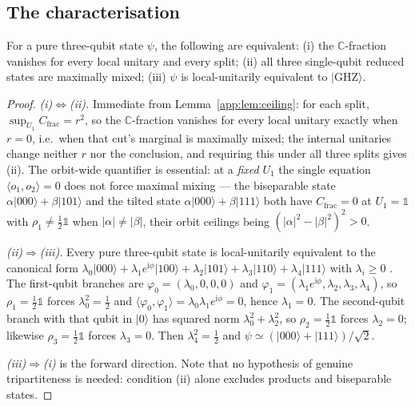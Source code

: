\subsection{The characterisation}

\begin{theorem}\label{app:thm:char}
For a pure three-qubit state $\psi$, the following are equivalent:
(i) the $\mathbb{C}$-fraction vanishes for every local unitary and every split;
(ii) all three single-qubit reduced states are maximally mixed;
(iii) $\psi$ is local-unitarily equivalent to $\lvert\mathrm{GHZ}\rangle$.
\end{theorem}

\begin{proof}
\emph{(i)$\Leftrightarrow$(ii).} Immediate from Lemma~\ref{app:lem:ceiling}: for each split,
$\sup_{U_1}C_{\mathrm{frac}} = r^2$, so the $\mathbb{C}$-fraction vanishes for every local unitary
exactly when $r = 0$, i.e.\ when that cut's marginal is maximally mixed; the internal unitaries
change neither $r$ nor the conclusion, and requiring this under all three splits gives (ii). The
orbit-wide quantifier is essential: at a \emph{fixed} $U_1$ the single equation
$\langle o_1,o_2\rangle = 0$ does not force maximal mixing --- the biseparable state
$\alpha\lvert000\rangle+\beta\lvert101\rangle$ and the tilted state
$\alpha\lvert000\rangle+\beta\lvert111\rangle$ both have $C_{\mathrm{frac}} = 0$ at $U_1=\mathbb{1}$
with $\rho_1\neq\tfrac12\mathbb{1}$ when $|\alpha|\neq|\beta|$, their orbit ceilings being
$(|\alpha|^2-|\beta|^2)^2 > 0$.

\emph{(ii)$\Rightarrow$(iii).} Every pure three-qubit state is local-unitarily equivalent to the
canonical form
$\lambda_0\lvert000\rangle + \lambda_1e^{\mathrm{i}\phi}\lvert100\rangle + \lambda_2\lvert101\rangle
+ \lambda_3\lvert110\rangle + \lambda_4\lvert111\rangle$ with $\lambda_i\ge0$
\autocite{acin2000generalized}. The first-qubit branches are $\varphi_0 = (\lambda_0,0,0,0)$ and
$\varphi_1 = (\lambda_1e^{\mathrm{i}\phi},\lambda_2,\lambda_3,\lambda_4)$, so
$\rho_1 = \tfrac12\mathbb{1}$ forces $\lambda_0^2 = \tfrac12$ and
$\langle\varphi_0,\varphi_1\rangle = \lambda_0\lambda_1e^{\mathrm{i}\phi} = 0$, hence
$\lambda_1 = 0$. The second-qubit branch with that qubit in $\lvert0\rangle$ has squared norm
$\lambda_0^2+\lambda_2^2$, so $\rho_2 = \tfrac12\mathbb{1}$ forces $\lambda_2 = 0$; likewise
$\rho_3 = \tfrac12\mathbb{1}$ forces $\lambda_3 = 0$. Then $\lambda_4^2 = \tfrac12$ and
$\psi \simeq (\lvert000\rangle+\lvert111\rangle)/\sqrt2$.

\emph{(iii)$\Rightarrow$(i)} is the forward direction. Note that no hypothesis of genuine
tripartiteness is needed: condition (ii) alone excludes products and biseparable states.
\end{proof}

